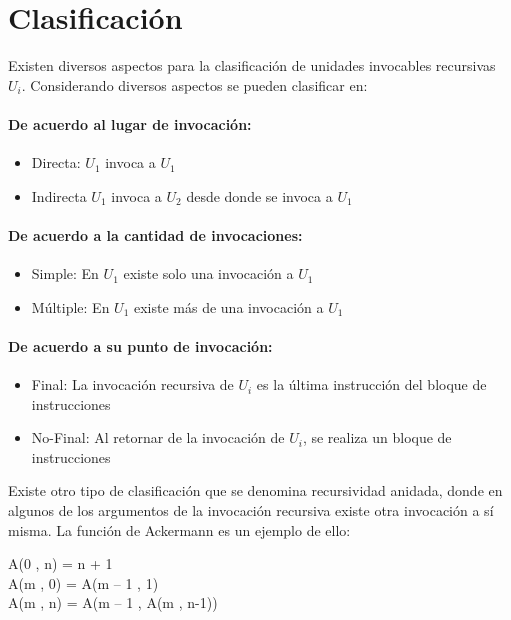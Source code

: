\section{Clasificación}

Existen diversos aspectos para la clasificación de unidades invocables recursivas $U_i$. Considerando diversos aspectos se pueden clasificar en:


\paragraph{De acuerdo al lugar de invocación:}
\begin{itemize}
\item Directa: $U_1$ invoca a $U_1$
\item Indirecta $U_1$ invoca a $U_2$ desde donde se invoca a $U_1$
\end{itemize}

\paragraph{De acuerdo a la cantidad de invocaciones:}
\begin{itemize}
\item Simple: En $U_1$ existe solo una invocación a $U_1$
\item Múltiple: En $U_1$ existe más de una invocación a $U_1$
\end{itemize}

\paragraph{De acuerdo a su punto de invocación:}
\begin{itemize}
\item Final: La invocación recursiva de $U_i$ es la última instrucción del bloque de instrucciones
\item No-Final: Al retornar de la invocación de $U_i$, se realiza un bloque de instrucciones
\end{itemize}

Existe otro tipo de clasificación que se denomina recursividad anidada, donde en algunos de los argumentos de la invocación recursiva existe otra invocación a sí misma. La función de Ackermann es un ejemplo de ello:

A(0 , n) = n + 1 \\
A(m , 0) = A(m – 1 , 1) \\
A(m , n) = A(m – 1 , A(m , n-1)) 


